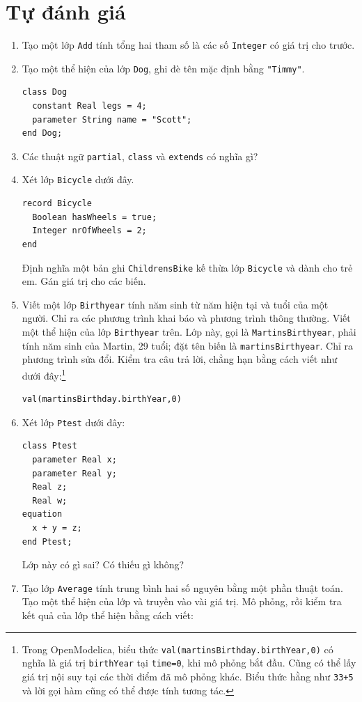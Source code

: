 \section{Tự đánh giá}
\begin{enumerate}
\item Tạo một lớp \texttt{Add} tính tổng hai tham số là các số \texttt{Integer} có giá trị cho trước.
\item Tạo một thể hiện của lớp \texttt{Dog}, ghi đè tên mặc định bằng \texttt{"Timmy"}.
\begin{verbatim}
class Dog
  constant Real legs = 4;
  parameter String name = "Scott";
end Dog;
\end{verbatim}
\item Các thuật ngữ \texttt{partial}, \texttt{class} và \texttt{extends} có nghĩa gì?
\item Xét lớp \texttt{Bicycle} dưới đây.
\begin{verbatim}
record Bicycle
  Boolean hasWheels = true;
  Integer nrOfWheels = 2;
end
\end{verbatim}
Định nghĩa một bản ghi \texttt{ChildrensBike} kế thừa lớp \texttt{Bicycle} và dành cho trẻ em. Gán giá trị cho các biến.
\item Viết một lớp \texttt{Birthyear} tính năm sinh từ năm hiện tại và tuổi của một người. Chỉ ra các phương trình khai báo và phương trình thông thường. Viết một thể hiện của lớp \texttt{Birthyear} trên. Lớp này, gọi là \texttt{MartinsBirthyear}, phải tính năm sinh của Martin, 29 tuổi; đặt tên biến là \texttt{martinsBirthyear}. Chỉ ra phương trình sửa đổi. Kiểm tra câu trả lời, chẳng hạn bằng cách viết như dưới đây:\footnote{Trong OpenModelica, biểu thức \texttt{val(martinsBirthday.birthYear,0)} có nghĩa là giá trị \texttt{birthYear} tại \texttt{time=0}, khi mô phỏng bắt đầu. Cũng có thể lấy giá trị nội suy tại các thời điểm đã mô phỏng khác. Biểu thức hằng như \texttt{33+5} và lời gọi hàm cũng có thể được tính tương tác.}
\begin{verbatim}
val(martinsBirthday.birthYear,0)
\end{verbatim}
\item Xét lớp \texttt{Ptest} dưới đây:
\begin{verbatim}
class Ptest
  parameter Real x;
  parameter Real y;
  Real z;
  Real w;
equation
  x + y = z;
end Ptest;
\end{verbatim}
Lớp này có gì sai? Có thiếu gì không?
\item Tạo lớp \texttt{Average} tính trung bình hai số nguyên bằng một phần thuật toán. Tạo một thể hiện của lớp và truyền vào vài giá trị. Mô phỏng, rồi kiểm tra kết quả của lớp thể hiện bằng cách viết:

\end{enumerate}
